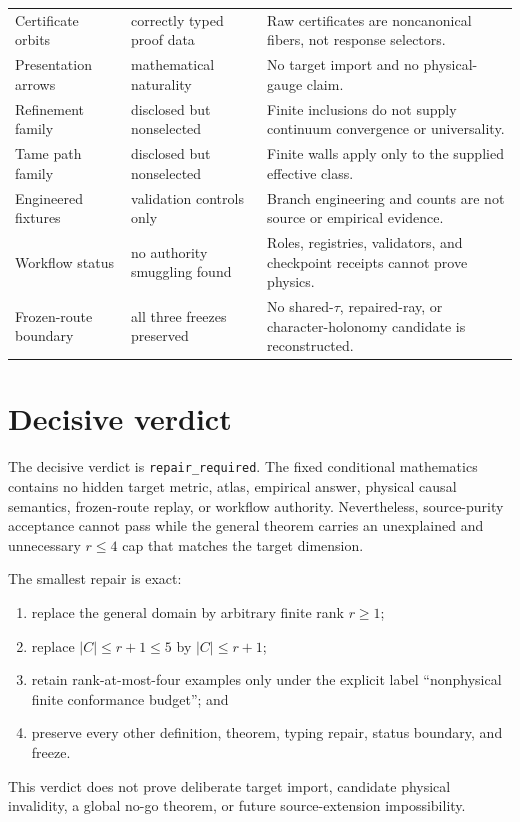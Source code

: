 \documentclass[11pt]{article}
\begin{document}
\begin{longtable}{p{}p{}p{}}
Certificate orbits & correctly typed proof data & Raw certificates are noncanonical fibers, not response selectors. \\
Presentation arrows & mathematical naturality & No target import and no physical-gauge claim. \\
Refinement family & disclosed but nonselected & Finite inclusions do not supply continuum convergence or universality. \\
Tame path family & disclosed but nonselected & Finite walls apply only to the supplied effective class. \\
Engineered fixtures & validation controls only & Branch engineering and counts are not source or empirical evidence. \\
Workflow status & no authority smuggling found & Roles, registries, validators, and checkpoint receipts cannot prove physics. \\
Frozen-route boundary & all three freezes preserved & No shared-$\tau$, repaired-ray, or character-holonomy candidate is reconstructed. \\
\bottomrule
\end{longtable}

\section{Decisive verdict}

The decisive verdict is \texttt{repair\_required}.  The fixed conditional
mathematics contains no hidden target metric, atlas, empirical answer, physical
causal semantics, frozen-route replay, or workflow authority.  Nevertheless,
source-purity acceptance cannot pass while the general theorem carries an
unexplained and unnecessary $r\le4$ cap that matches the target dimension.

The smallest repair is exact:
\begin{enumerate}[leftmargin=*]
  \item replace the general domain by arbitrary finite rank $r\ge1$;
  \item replace $|C|\le r+1\le5$ by $|C|\le r+1$;
  \item retain rank-at-most-four examples only under the explicit label
  ``nonphysical finite conformance budget''; and
  \item preserve every other definition, theorem, typing repair, status
  boundary, and freeze.
\end{enumerate}
This verdict does not prove deliberate target import, candidate physical
invalidity, a global no-go theorem, or future source-extension impossibility.
\end{document}
